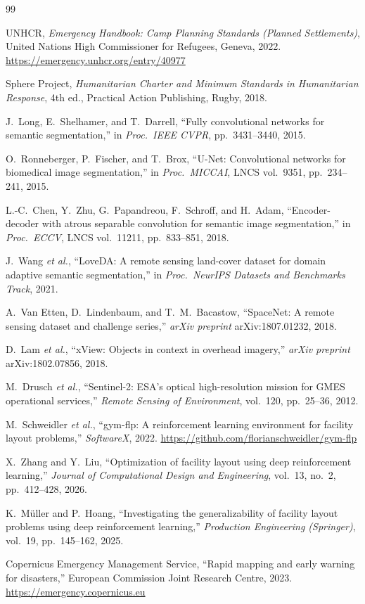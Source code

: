 \documentclass[twocolumn]{article}
\begin{document}
\begin{thebibliography}{99}

UNHCR, \textit{Emergency Handbook: Camp Planning Standards (Planned Settlements)},
United Nations High Commissioner for Refugees, Geneva, 2022.
\url{https://emergency.unhcr.org/entry/40977}

Sphere Project, \textit{Humanitarian Charter and Minimum Standards in Humanitarian Response},
4th ed., Practical Action Publishing, Rugby, 2018.

J.~Long, E.~Shelhamer, and T.~Darrell,
``Fully convolutional networks for semantic segmentation,''
in \textit{Proc.\ IEEE CVPR}, pp.~3431--3440, 2015.

O.~Ronneberger, P.~Fischer, and T.~Brox,
``U-Net: Convolutional networks for biomedical image segmentation,''
in \textit{Proc.\ MICCAI}, LNCS vol.~9351, pp.~234--241, 2015.

L.-C.~Chen, Y.~Zhu, G.~Papandreou, F.~Schroff, and H.~Adam,
``Encoder-decoder with atrous separable convolution for semantic image segmentation,''
in \textit{Proc.\ ECCV}, LNCS vol.~11211, pp.~833--851, 2018.

J.~Wang \textit{et al.},
``LoveDA: A remote sensing land-cover dataset for domain adaptive semantic segmentation,''
in \textit{Proc.\ NeurIPS Datasets and Benchmarks Track}, 2021.

A.~Van Etten, D.~Lindenbaum, and T.~M.~Bacastow,
``SpaceNet: A remote sensing dataset and challenge series,''
\textit{arXiv preprint} arXiv:1807.01232, 2018.

D.~Lam \textit{et al.},
``xView: Objects in context in overhead imagery,''
\textit{arXiv preprint} arXiv:1802.07856, 2018.

M.~Drusch \textit{et al.},
``Sentinel-2: ESA's optical high-resolution mission for GMES operational services,''
\textit{Remote Sensing of Environment}, vol.~120, pp.~25--36, 2012.

M.~Schweidler \textit{et al.},
``gym-flp: A reinforcement learning environment for facility layout problems,''
\textit{SoftwareX}, 2022.
\url{https://github.com/florianschweidler/gym-flp}

X.~Zhang and Y.~Liu,
``Optimization of facility layout using deep reinforcement learning,''
\textit{Journal of Computational Design and Engineering},
vol.~13, no.~2, pp.~412--428, 2026.

K.~M\"{u}ller and P.~Hoang,
``Investigating the generalizability of facility layout problems using deep reinforcement
learning,''
\textit{Production Engineering (Springer)}, vol.~19, pp.~145--162, 2025.

Copernicus Emergency Management Service,
``Rapid mapping and early warning for disasters,''
European Commission Joint Research Centre, 2023.
\url{https://emergency.copernicus.eu}

\end{thebibliography}
\end{document}
